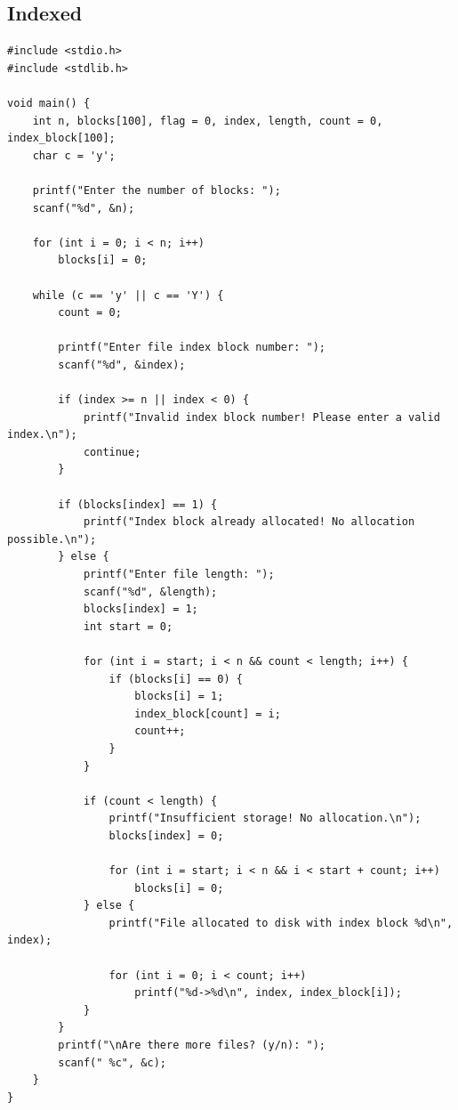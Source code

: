 \subsection{Indexed}
\begin{lstlisting}[label={list:c_program:queue}]
#include <stdio.h>
#include <stdlib.h>

void main() {
    int n, blocks[100], flag = 0, index, length, count = 0, index_block[100];
    char c = 'y';

    printf("Enter the number of blocks: ");
    scanf("%d", &n);

    for (int i = 0; i < n; i++)
        blocks[i] = 0;

    while (c == 'y' || c == 'Y') {
        count = 0;

        printf("Enter file index block number: ");
        scanf("%d", &index);

        if (index >= n || index < 0) {
            printf("Invalid index block number! Please enter a valid index.\n");
            continue;
        }

        if (blocks[index] == 1) {
            printf("Index block already allocated! No allocation possible.\n");
        } else {
            printf("Enter file length: ");
            scanf("%d", &length);
            blocks[index] = 1;
            int start = 0;

            for (int i = start; i < n && count < length; i++) {
                if (blocks[i] == 0) {
                    blocks[i] = 1;
                    index_block[count] = i;
                    count++;
                }
            }

            if (count < length) {
                printf("Insufficient storage! No allocation.\n");
                blocks[index] = 0;

                for (int i = start; i < n && i < start + count; i++)
                    blocks[i] = 0;
            } else {
                printf("File allocated to disk with index block %d\n", index);
                
                for (int i = 0; i < count; i++)
                    printf("%d->%d\n", index, index_block[i]);
            }
        }
        printf("\nAre there more files? (y/n): ");
        scanf(" %c", &c);
    }
}
\end{lstlisting}


